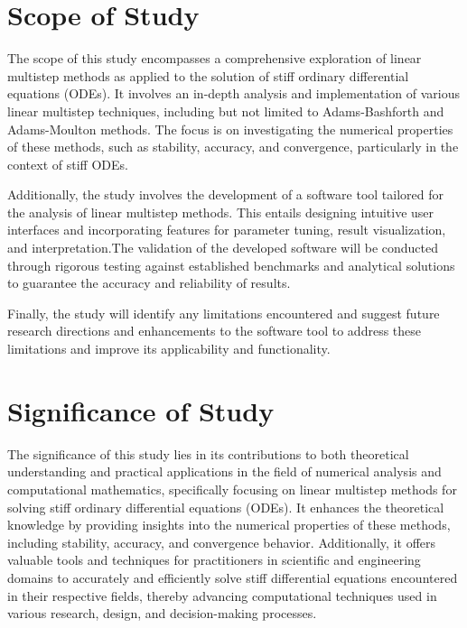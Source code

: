 \section{Scope of Study}
The scope of this study encompasses a comprehensive exploration of linear multistep methods as applied to the solution of stiff ordinary differential equations (ODEs). It involves an in-depth analysis and implementation of various linear multistep techniques, including but not limited to Adams-Bashforth and Adams-Moulton methods. The focus is on investigating the numerical properties of these methods, such as stability, accuracy, and convergence, particularly in the context of stiff ODEs.

Additionally, the study involves the development of a software tool tailored for the analysis of linear multistep methods. This entails designing intuitive user interfaces and incorporating features for parameter tuning, result visualization, and interpretation.The validation of the developed software will be conducted through rigorous testing against established benchmarks and analytical solutions to guarantee the accuracy and reliability of results. 

Finally, the study will identify any limitations encountered and suggest future research directions and enhancements to the software tool to address these limitations and improve its applicability and functionality.

\section{Significance of Study}
The significance of this study lies in its contributions to both theoretical understanding and practical applications in the field of numerical analysis and computational mathematics, specifically focusing on linear multistep methods for solving stiff ordinary differential equations (ODEs). It enhances the theoretical knowledge by providing insights into the numerical properties of these methods, including stability, accuracy, and convergence behavior. Additionally, it offers valuable tools and techniques for practitioners in scientific and engineering domains to accurately and efficiently solve stiff differential equations encountered in their respective fields, thereby advancing computational techniques used in various research, design, and decision-making processes.



